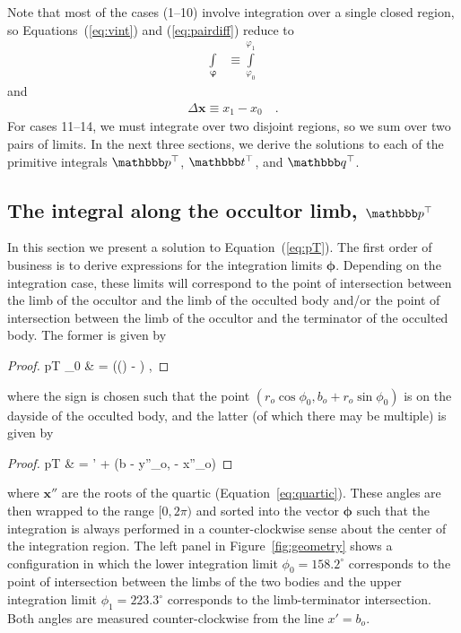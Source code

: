 \documentclass[modern]{aastex62}
\begin{document}
%
Note that most of the cases (1--10) involve integration over a single closed
region, so Equations~(\ref{eq:vint}) and (\ref{eq:pairdiff}) reduce to
%
\begin{align}
    \int\limits_{\pmb{\varphi}} & \equiv
    \int\limits_{\varphi_{0}}^{\varphi_{1}}
\end{align}
%
and
%
\begin{align}
    \Delta \mathbf{x} \equiv x_1 - x_0
    \quad.
\end{align}
%
For cases 11--14, we must integrate over two disjoint regions, so we
sum over two pairs of limits.
%
In the next three sections, we derive the solutions to each of the
primitive integrals $\pT$, $\tT$, and $\qT$.

\subsection{The integral along the occultor limb, $\pT$}
\label{sec:pT}
%
In this section we present a solution to Equation~(\ref{eq:pT}). The first
order of business is to derive expressions for the integration limits
$\pmb{\phi}$. Depending on the integration case, these limits will correspond
to the point of intersection between the limb of the occultor and the
limb of the occulted body and/or the point of intersection between the limb
of the occultor and the terminator of the occulted body.
The former is given by
\citep[c.f. Equation~24 in][]{Luger2019}
%
\begin{proof}{pT}
    \phi_0 & =
     \pm \left(\arcsin\left(\right) - \right)
    \quad,
\end{proof}
%
where the sign is chosen such that the point
$(r_o\cos\phi_0, b_o + r_o\sin\phi_0)$ is on the dayside of the occulted body,
and the latter (of which there may be multiple) is given by
%
\begin{proof}{pT}
     & =
    \theta' +
    \atantwo
    \left(b - y''_o,  - x''_o\right)
    \quad
\end{proof}
%
where $\mathbf{x''}$ are the roots of the quartic (Equation~\ref{eq:quartic}).
These angles are then wrapped to the range $[0, 2\pi)$
and sorted into the vector $\pmb{\phi}$ such that
the integration is always performed in a counter-clockwise sense about
the center of the integration region.
%
The left panel in Figure~\ref{fig:geometry} shows a configuration in which
the lower integration limit $\phi_0 = 158.2^\circ$ corresponds to the
point of intersection between the limbs of the two bodies and the upper
integration limit $\phi_1 = 223.3^\circ$ corresponds to the
limb-terminator intersection. Both angles are measured counter-clockwise
from the line $x' = b_o$.
\end{document}
